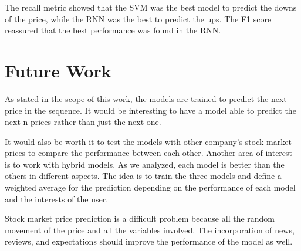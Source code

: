 The recall metric showed that the SVM was the best model to predict the downs of the price, while the RNN was the best to predict the ups. The F1 score reassured that the best performance was found in the RNN.

\section{Future Work}

As stated in the scope of this work, the models are trained to predict the next price in the sequence. It would be interesting to have a model able to predict the next n prices rather than just the next one.

It would also be worth it to test the models with other company's stock market prices to compare the performance between each other. Another area of interest is to work with hybrid models. As we analyzed, each model is better than the others in different aspects. The idea is to train the three models and define a weighted average for the prediction depending on the performance of each model and the interests of the user.

Stock market price prediction is a difficult problem because all the random movement of the price and all the variables involved. The incorporation of news, reviews, and expectations should improve the performance of the model as well. 

